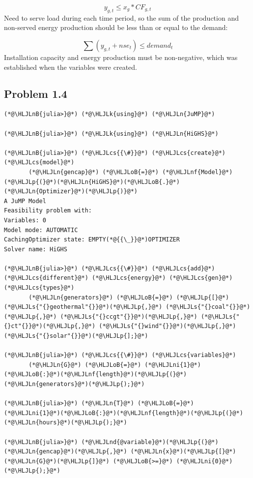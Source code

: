 \documentclass[12pt,a4paper]{article}
\newcommand{\HLJLk}[1]{\textcolor[RGB]{148,91,176}{\textbf{#1}}}
\newcommand{\HLJLn}[1]{#1}
\newcommand{\HLJLnd}[1]{\textcolor[RGB]{214,102,97}{#1}}
\newcommand{\HLJLnf}[1]{\textcolor[RGB]{66,102,213}{#1}}
\newcommand{\HLJLs}[1]{\textcolor[RGB]{201,61,57}{#1}}
\newcommand{\HLJLnB}[1]{\textcolor[RGB]{59,151,46}{#1}}
\newcommand{\HLJLni}[1]{\textcolor[RGB]{59,151,46}{#1}}
\newcommand{\HLJLoB}[1]{\textcolor[RGB]{102,102,102}{\textbf{#1}}}
\newcommand{\HLJLp}[1]{#1}
\newcommand{\HLJLcs}[1]{\textcolor[RGB]{153,153,119}{\textit{#1}}}
\begin{document}
\[

y_{g,t} \leq x_g * CF_{g,t}

\]
Need to serve load during each time period, so the sum of the production and non-served energy production should be less than or equal to the demand:

\[

\sum (y_{g,t} + nse_{t}) \leq demand_t

\]
Installation capacity and energy production must be non-negative, which was established when the variables were created.

\subsection{Problem 1.4}

\begin{lstlisting}
(*@\HLJLnB{julia>}@*) (*@\HLJLk{using}@*) (*@\HLJLn{JuMP}@*)

(*@\HLJLnB{julia>}@*) (*@\HLJLk{using}@*) (*@\HLJLn{HiGHS}@*)

(*@\HLJLnB{julia>}@*) (*@\HLJLcs{{\#}}@*) (*@\HLJLcs{create}@*) (*@\HLJLcs{model}@*)
       (*@\HLJLn{gencap}@*) (*@\HLJLoB{=}@*) (*@\HLJLnf{Model}@*)(*@\HLJLp{(}@*)(*@\HLJLn{HiGHS}@*)(*@\HLJLoB{.}@*)(*@\HLJLn{Optimizer}@*)(*@\HLJLp{)}@*)
A JuMP Model
Feasibility problem with:
Variables: 0
Model mode: AUTOMATIC
CachingOptimizer state: EMPTY(*@{{\_}}@*)OPTIMIZER
Solver name: HiGHS

(*@\HLJLnB{julia>}@*) (*@\HLJLcs{{\#}}@*) (*@\HLJLcs{add}@*) (*@\HLJLcs{different}@*) (*@\HLJLcs{energy}@*) (*@\HLJLcs{gen}@*) (*@\HLJLcs{types}@*)
       (*@\HLJLn{generators}@*) (*@\HLJLoB{=}@*) (*@\HLJLp{[}@*)(*@\HLJLs{"{}geothermal"{}}@*)(*@\HLJLp{,}@*) (*@\HLJLs{"{}coal"{}}@*)(*@\HLJLp{,}@*) (*@\HLJLs{"{}ccgt"{}}@*)(*@\HLJLp{,}@*) (*@\HLJLs{"{}ct"{}}@*)(*@\HLJLp{,}@*) (*@\HLJLs{"{}wind"{}}@*)(*@\HLJLp{,}@*) (*@\HLJLs{"{}solar"{}}@*)(*@\HLJLp{];}@*)

(*@\HLJLnB{julia>}@*) (*@\HLJLcs{{\#}}@*) (*@\HLJLcs{variables}@*)
       (*@\HLJLn{G}@*) (*@\HLJLoB{=}@*) (*@\HLJLni{1}@*)(*@\HLJLoB{:}@*)(*@\HLJLnf{length}@*)(*@\HLJLp{(}@*)(*@\HLJLn{generators}@*)(*@\HLJLp{);}@*)

(*@\HLJLnB{julia>}@*) (*@\HLJLn{T}@*) (*@\HLJLoB{=}@*) (*@\HLJLni{1}@*)(*@\HLJLoB{:}@*)(*@\HLJLnf{length}@*)(*@\HLJLp{(}@*)(*@\HLJLn{hours}@*)(*@\HLJLp{);}@*)

(*@\HLJLnB{julia>}@*) (*@\HLJLnd{@variable}@*)(*@\HLJLp{(}@*)(*@\HLJLn{gencap}@*)(*@\HLJLp{,}@*) (*@\HLJLn{x}@*)(*@\HLJLp{[}@*)(*@\HLJLn{G}@*)(*@\HLJLp{]}@*) (*@\HLJLoB{>=}@*) (*@\HLJLni{0}@*)(*@\HLJLp{);}@*)


\end{lstlisting}
\end{document}
